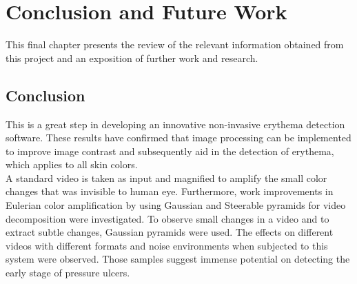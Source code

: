 \chapter{Conclusion and Future Work}
This final chapter presents the review of the relevant information obtained from this project and an exposition of further work and research.\\

\section{Conclusion} 
This is a great step in developing an innovative non-invasive erythema detection software. These results have confirmed that image processing can be implemented to improve image contrast and subsequently aid in the detection of erythema, which applies to all skin colors.\\

A standard video is taken as input and magnified to amplify the small color changes that was invisible to human eye. Furthermore, work improvements in Eulerian color amplification by using Gaussian and Steerable pyramids for video decomposition
were investigated. To observe small changes in a video and to extract subtle changes, Gaussian pyramids were used. The effects on different videos with different formats and noise environments when subjected to this system were observed. Those samples suggest immense potential on detecting the early stage of pressure ulcers.\\

